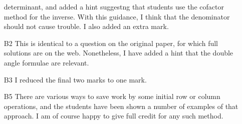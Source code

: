 \documentclass{amsart}
\begin{document}
\begin{itemize}
  determinant, and added a hint suggestng that students use the
  cofactor method for the inverse.  With this guidance, I think that
  the denominator should not cause trouble.  I also added an extra
  mark. 
 \item[B2] This is identical to a question on the original paper, for
  which full solutions are on the web.  Nonetheless, I have added a
  hint that the double angle formulae are relevant.
 \item[B3] I reduced the final two marks to one mark.
 \item[B5] There are various ways to save work by some initial row or
  column operations, and the students have been shown a number of
  examples of that approach.  I am of course happy to give full credit
  for any such method.
\end{itemize}
\end{document}
